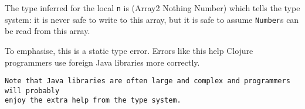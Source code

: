 \documentclass{sigplanconf}
\begin{document}
The type inferred for the local \lstinline|n| is (Array2 Nothing Number)
which tells the type system: it is never safe to write to this array, but
it is safe to assume \lstinline|Number|s can be read from this array.

To emphasise, this is a static type error. Errors like this help Clojure programmers
use foreign Java libraries more correctly.

\begin{verbatim}
Note that Java libraries are often large and complex and programmers will probably
enjoy the extra help from the type system.
\end{verbatim}

%

%


%
%
%
%
%
\end{document}
